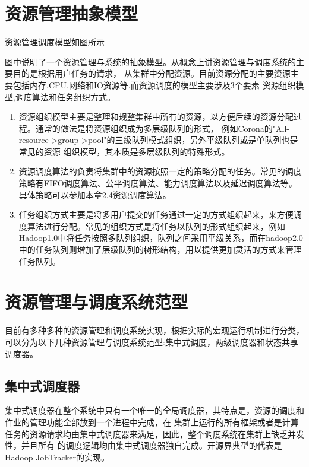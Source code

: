 \section{资源管理抽象模型}
 
资源管理调度模型如图所示

图中说明了一个资源管理与系统的抽象模型。从概念上讲资源管理与调度系统的主要目的是根据用户任务的请求，
从集群中分配资源。目前资源分配的主要资源主要包括内存,CPU,网络和IO资源等.而资源调度的模型主要涉及3个要素
资源组织模型,调度算法和任务组织方式。
\begin{enumerate}
\item 资源组织模型主要是整理和规整集群中所有的资源，以方便后续的资源分配过程。通常的做法是将资源组织成为多层级队列的形式，
例如Corona的"All-resource->group->pool"的三级队列模式组织，另外平级队列或是单队列也是常见的资源
组织模型，其本质是多层级队列的特殊形式。
\item 资源调度算法的负责将集群中的资源按照一定的策略分配的任务。常见的调度策略有FIFO调度算法、公平调度算法、能力调度算法以及延迟调度算法等。具体策略可以参加本章2.4资源调度算法。
\item 任务组织方式主要是将多用户提交的任务通过一定的方式组织起来，来方便调度算法进行分配。常见的组织方式是将任务以队列的形式组织起来，例如Hadoop1.0中将任务按照多队列组织，队列之间采用平级关系，而在hadoop2.0中的任务队列则增加了层级队列的树形结构，用以提供更加灵活的方式来管理任务队列。
\end{enumerate}
\section{资源管理与调度系统范型}
目前有多种多种的资源管理和调度系统实现，根据实际的宏观运行机制进行分类，可以分为以下几种资源管理与调度系统范型:集中式调度，两级调度器和状态共享调度器。

\subsection{集中式调度器}
集中式调度器在整个系统中只有一个唯一的全局调度器，其特点是，资源的调度和作业的管理功能全部放到一个进程中完成，在
集群上运行的所有框架或者是计算任务的资源请求均由集中式调度器来满足，因此，整个调度系统在集群上缺乏并发性，并且所有
的调度逻辑均由集中式调度器独自完成。开源界典型的代表是Hadoop JobTracker的实现。

